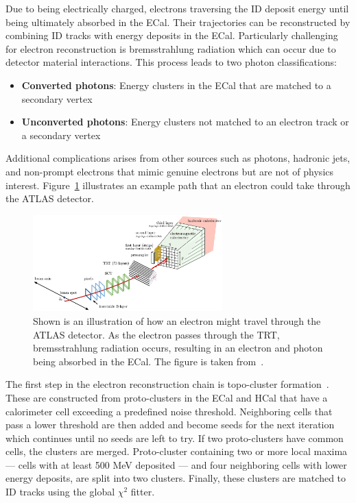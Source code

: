 Due to being electrically charged, electrons traversing the ID deposit energy until being ultimately absorbed in the ECal. Their trajectories can be reconstructed by combining ID tracks with energy deposits in the ECal. Particularly challenging for electron reconstruction is bremsstrahlung radiation which can occur due to detector material interactions. This process leads to two photon classifications:
\begin{itemize}
  \item \textbf{Converted photons}: Energy clusters in the ECal that are matched to a secondary vertex
  \item \textbf{Unconverted photons}: Energy clusters not matched to an electron track or a secondary vertex
\end{itemize}

Additional complications arises from other sources such as photons, hadronic jets, and non-prompt electrons that mimic genuine electrons but are not of physics interest. Figure~\ref{fig:reco_electron_track} illustrates an example path that an electron could take through the ATLAS detector.
\begin{figure}[hpt]
  \centering
  \includegraphics[width=0.65\textwidth]{figures/reco/reco_electron_track.png}
  \caption{Shown is an illustration of how an electron might travel through the ATLAS detector. As the electron passes through the TRT, bremsstrahlung radiation occurs, resulting in an electron and photon being absorbed in the ECal. The figure is taken from~\cite{ATLAS:2019jvq}.}\label{fig:reco_electron_track}
\end{figure}

The first step in the electron reconstruction chain is topo-cluster formation~\cite{ATLAS:2016krp}. These are constructed from proto-clusters in the ECal and HCal that have a calorimeter cell exceeding a predefined noise threshold. Neighboring cells that pass a lower threshold are then added and become seeds for the next iteration which continues until no seeds are left to try. If two proto-clusters have common cells, the clusters are merged. Proto-cluster containing two or more local maxima --- cells with at least 500 MeV deposited --- and four neighboring cells with lower energy deposits, are split into two clusters. Finally, these clusters are matched to ID tracks using the global $\chi^{2}$ fitter.

